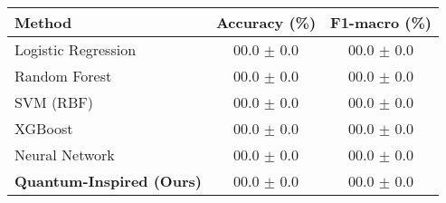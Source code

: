 \begin{tabular}{lcc}
\toprule
\textbf{Method} & \textbf{Accuracy (\%)} & \textbf{F1-macro (\%)} \\
\midrule
Logistic Regression & 00.0 $\pm$ 0.0 & 00.0 $\pm$ 0.0 \\
Random Forest       & 00.0 $\pm$ 0.0 & 00.0 $\pm$ 0.0 \\
SVM (RBF)           & 00.0 $\pm$ 0.0 & 00.0 $\pm$ 0.0 \\
XGBoost             & 00.0 $\pm$ 0.0 & 00.0 $\pm$ 0.0 \\
Neural Network      & 00.0 $\pm$ 0.0 & 00.0 $\pm$ 0.0 \\
\textbf{Quantum-Inspired (Ours)} & 00.0 $\pm$ 0.0 & 00.0 $\pm$ 0.0 \\
\bottomrule
\end{tabular}